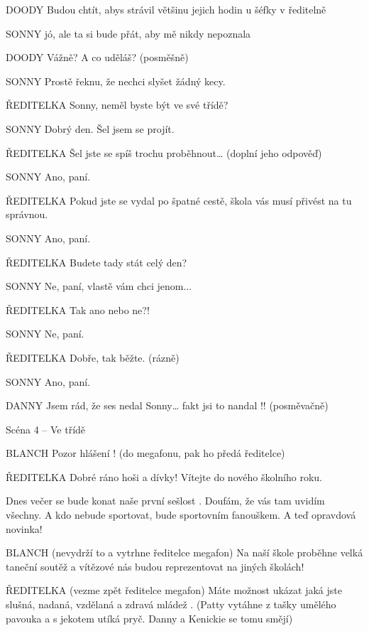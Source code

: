 DOODY        Budou chtít, abys strávil většinu jejich hodin u šéfky v ředitelně

SONNY        jó, ale ta si bude přát, aby mě nikdy nepoznala

DOODY        Vážně? A co uděláš? (posměšně)

SONNY        Prostě řeknu, že nechci slyšet žádný kecy. 

ŘEDITELKA         Sonny, neměl byste být ve své třídě?

SONNY         Dobrý den. Šel jsem se projít.

ŘEDITELKA        Šel jste se spíš trochu proběhnout… (doplní jeho odpověď)

SONNY        Ano, paní.

ŘEDITELKA        Pokud jste se vydal po špatné cestě, škola vás musí přivést na tu                 správnou.

SONNY        Ano, paní.

ŘEDITELKA        Budete tady stát celý den?

SONNY        Ne, paní, vlastě vám chci jenom...

ŘEDITELKA        Tak ano nebo ne?!

SONNY        Ne, paní.

ŘEDITELKA        Dobře, tak běžte. (rázně)

SONNY        Ano, paní.

DANNY        Jsem rád, že ses nedal  Sonny… fakt jsi to nandal !! (posměvačně)

Scéna 4 – Ve třídě 

      BLANCH            Pozor hlášení ! (do megafonu, pak ho předá ředitelce)

        ŘEDITELKA                  Dobré ráno hoši a dívky! Vítejte do nového školního roku.

      Dnes večer se bude konat naše první sešlost . Doufám, že vás tam  uvidím všechny. A kdo nebude sportovat, bude sportovním fanouškem. A  teď opravdová novinka!  

      BLANCH            (nevydrží to a vytrhne ředitelce megafon) Na naší škole proběhne velká taneční soutěž  a vítězové nás budou reprezentovat na jiných školách!

      ŘEDITELKA        (vezme zpět ředitelce megafon) Máte možnost ukázat jaká jste slušná, nadaná, vzdělaná a zdravá mládež . (Patty vytáhne z tašky umělého pavouka a s jekotem utíká pryč.         Danny a Kenickie se tomu smějí)        

                                

